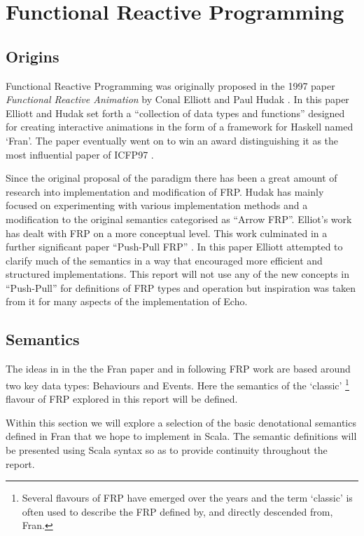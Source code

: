 \chapter{Functional Reactive Programming}
  \section{Origins}
    Functional Reactive Programming was originally proposed in the 1997 paper \emph{Functional
    Reactive Animation} by Conal Elliott and Paul Hudak \cite{Elliott1997}. In this paper Elliott and Hudak
    set forth a ``collection of data types and functions'' designed for creating interactive 
    animations in the form of a framework for Haskell named `Fran'. The paper eventually went on to
    win an award distinguishing it as the most influential paper of ICFP97 \cite{SIGPLAN}. 
    
    Since the original proposal of the paradigm there has been a great amount of research
    into implementation and modification of FRP. Hudak has mainly focused on experimenting with various
    implementation methods and a modification to the original semantics categorised as ``Arrow FRP''. Elliot's
    work has dealt with FRP on a more conceptual level. This work culminated in a further significant paper
    ``Push-Pull FRP'' \cite{Elliott2009}. In this paper Elliott attempted to clarify much of the semantics in a way that encouraged more efficient 
    and
    structured implementations. This report will not use any of the new concepts in ``Push-Pull'' for definitions
    of FRP types and operation but inspiration was taken from it for many aspects of the implementation of Echo.

  \section{Semantics}
    The ideas in in the the Fran paper and in following FRP work are based around two key data types: 
    Behaviours and Events. Here the semantics of the `classic' \footnote{Several
    flavours of FRP have emerged over the years and the term `classic' is often used to describe
    the FRP defined by, and directly descended from, Fran.} flavour of FRP explored in this report will be defined.
    
    Within this section we will explore a selection of the basic denotational semantics defined in Fran
    that we hope to implement in Scala. The semantic definitions will
    be presented using Scala syntax so as to provide continuity throughout the report.
  
